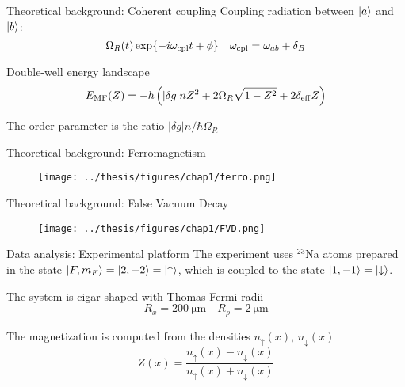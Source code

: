 \documentclass[handout]{beamer}
\begin{document}

\begin{frame}{Theoretical background: Coherent coupling}
    Coupling radiation between $\ket{a}$ and $\ket{b}$:
    \[
        \Omega_R(t)\exp{-i\omega_{\rm cpl}t+\phi} \quad \omega_{\rm cpl} = \omega_{ab} + \delta_B
    \]

    Double-well energy landscape
    \begin{equation*}
        E_{\rm MF}(Z) = -\hbar\left(|\delta g|n Z^2 + 2\Omega_R \sqrt{1-Z^2} + 2\delta_{\rm eff} Z\right)
        \label{eq:E_MF}
    \end{equation*}

    The order parameter is the ratio $|\delta g|n/\hbar\Omega_R$
\end{frame}

\begin{frame}{Theoretical background: Ferromagnetism}
    \begin{figure}
        \centering
        \texttt{[image: ../thesis/figures/chap1/ferro.png]}
    \end{figure}
\end{frame}

\begin{frame}{Theoretical background: False Vacuum Decay}
    \begin{figure}
        \centering
        \texttt{[image: ../thesis/figures/chap1/FVD.png]}
    \end{figure}    
\end{frame}

\begin{frame}{Data analysis: Experimental platform}
    The experiment uses $^{23}$Na atoms prepared in the state $\ket{F,m_F} = \ket{2, -2} = \ket{\uparrow}$, which is coupled to the state $\ket{1, -1} = \ket{\downarrow}$.

    The system is cigar-shaped with Thomas-Fermi radii 
    \begin{equation*}
        R_x = 200\ \unit{\micro\meter} \quad R_\rho = 2\ \unit{\micro\meter}
    \end{equation*}

    The magnetization is computed from the densities $n_\uparrow(x)$, $n_\downarrow(x)$
    \begin{equation*}
        Z(x) = \frac{n_\uparrow(x) - n_\downarrow(x)}{n_\uparrow(x) + n_\downarrow(x)}
    \end{equation*}
\end{frame}
\end{document}
